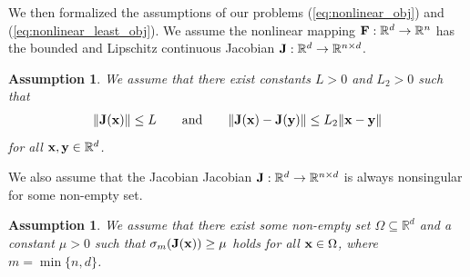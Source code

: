\documentclass[11pt]{article}
\theoremstyle{plain}
\newtheorem{assumption}[theorem]{Assumption}
\theoremstyle{definition}
\theoremstyle{remark}
\newtheorem{remark}[theorem]{Remark}
\theoremstyle{plain}
\def\vx{{\bf{x}}}
\def\vy{{\bf{y}}}
\def\BR{{\mathbb{R}}}
\def\mJ {{\bf J}}
\def\vx {{{\bf x}}}
\def\vy {{{\bf y}}}
\def\BR{{\mathbb{R}}}
\def\F{{\bf F}}
\def \J{{\bf J}}
\def\x{{\bf x}}
\def\y{{\bf y}}
\def\0{{\bf 0}}
\def\RB{{\mathbb R}}
\begin{document}
We then formalized the assumptions of our problems (\ref{eq:nonlinear_obj}) and (\ref{eq:nonlinear_least_obj}). 
We assume the nonlinear mapping $\F:\BR^d\to\BR^n$ 
has the bounded and Lipschitz continuous Jacobian $\mJ:\BR^d\to\BR^{n\times d}$.
\begin{assumption}
\label{ass:Jlip}
    We assume that there exist constants $L>0$ and $L_2>0$ such that
    \begin{align}
    \label{eq:lip}
    \|\J(\x)\|\leq L\qquad\text{and}\qquad\| \J(\x)-\J(\y)\|\leq L_2\|\x-\y\| 
    \end{align}
    for all $\vx,\vy\in\BR^d$. 
\end{assumption}
We also assume that the Jacobian Jacobian $\mJ:\BR^d\to\BR^{n\times d}$ is always nonsingular for some non-empty set.
\begin{assumption}
\label{ass:nonsingular}
We assume that there exist some non-empty set $\Omega\subseteq\RB^d$ 
and a constant $\mu>0$ such that $\sigma_m(\J(\x))\geq \mu$ holds for all $\x\in\Omega$, where $m=\min\{n,d\}$.
\end{assumption}
\end{document}
